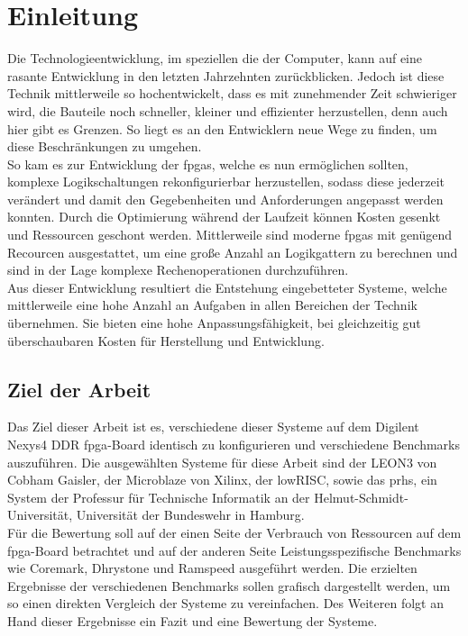 \chapter{Einleitung}\label{ch:einleitung}

Die Technologieentwicklung, im speziellen die der Computer, kann auf eine rasante Entwicklung in den letzten
Jahrzehnten zurückblicken. Jedoch ist diese Technik mittlerweile so hochentwickelt, dass es mit zunehmender Zeit
schwieriger wird, die Bauteile noch schneller, kleiner und effizienter herzustellen, denn auch hier gibt es Grenzen.
So liegt es an den Entwicklern neue Wege zu finden, um diese Beschränkungen zu umgehen. \\
So kam es zur Entwicklung der \acp{fpga}, welche es nun ermöglichen sollten, komplexe Logikschaltungen
rekonfigurierbar herzustellen, sodass diese jederzeit verändert und damit den Gegebenheiten und
Anforderungen angepasst werden konnten. Durch die Optimierung während der Laufzeit können Kosten gesenkt und
Ressourcen geschont werden. Mittlerweile sind moderne \acp{fpga} mit genügend Recourcen ausgestattet, um eine
große Anzahl an Logikgattern zu berechnen und sind in der Lage komplexe Rechenoperationen durchzuführen.\\
Aus dieser Entwicklung resultiert die Entstehung eingebetteter Systeme, welche mittlerweile eine hohe Anzahl an Aufgaben in allen Bereichen der Technik übernehmen.
Sie bieten eine hohe Anpassungsfähigkeit, bei gleichzeitig gut überschaubaren Kosten für Herstellung und Entwicklung.\\

\section{Ziel der Arbeit}\label{kap:zielderarbeit}

Das Ziel dieser Arbeit ist es, verschiedene dieser Systeme auf dem Digilent Nexys4 DDR \ac{fpga}-Board identisch zu konfigurieren und verschiedene Benchmarks auszuführen.
Die ausgewählten Systeme für diese Arbeit sind der LEON3 von Cobham Gaisler, der Microblaze von Xilinx, der lowRISC, sowie das \ac{prhs}, ein System der
Professur für Technische Informatik an der Helmut-Schmidt-Universität, Universität der Bundeswehr in Hamburg.\\
Für die Bewertung soll auf der einen Seite der Verbrauch von Ressourcen auf dem \ac{fpga}-Board betrachtet und auf der anderen Seite Leistungsspezifische Benchmarks
wie Coremark, Dhrystone und Ramspeed ausgeführt werden. Die erzielten Ergebnisse der verschiedenen Benchmarks sollen
grafisch dargestellt werden, um so einen direkten Vergleich der Systeme zu vereinfachen. Des Weiteren folgt an Hand dieser Ergebnisse ein Fazit und eine
Bewertung der Systeme.\\


